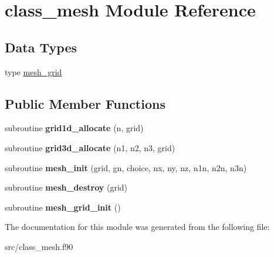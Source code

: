 \hypertarget{classclass__mesh}{\section{class\-\_\-mesh Module Reference}
\label{classclass__mesh}
}
\subsection*{Data Types}
\begin{DoxyCompactItemize}
\item 
type \hyperlink{structclass__mesh_1_1mesh__grid}{mesh\-\_\-grid}
\end{DoxyCompactItemize}
\subsection*{Public Member Functions}
\begin{DoxyCompactItemize}
\item 
\hypertarget{classclass__mesh_a4694eff2e66dc3c6f4c95a4783d0b3cd}{subroutine {\bfseries grid1d\-\_\-allocate} (n, grid)}\label{classclass__mesh_a4694eff2e66dc3c6f4c95a4783d0b3cd}

\item 
\hypertarget{classclass__mesh_a00657d0b88563b96fc3d366a6f5701c9}{subroutine {\bfseries grid3d\-\_\-allocate} (n1, n2, n3, grid)}\label{classclass__mesh_a00657d0b88563b96fc3d366a6f5701c9}

\item 
\hypertarget{classclass__mesh_a8a025df9ede8877a7f59dc4cc9f45cc0}{subroutine {\bfseries mesh\-\_\-init} (grid, gn, choice, nx, ny, nz, n1n, n2n, n3n)}\label{classclass__mesh_a8a025df9ede8877a7f59dc4cc9f45cc0}

\item 
\hypertarget{classclass__mesh_af3070ea3d761bef66d8c9dc6a0a13df6}{subroutine {\bfseries mesh\-\_\-destroy} (grid)}\label{classclass__mesh_af3070ea3d761bef66d8c9dc6a0a13df6}

\item 
\hypertarget{classclass__mesh_aeb0629c9867ec7108d9c02b76971f864}{subroutine {\bfseries mesh\-\_\-grid\-\_\-init} ()}\label{classclass__mesh_aeb0629c9867ec7108d9c02b76971f864}

\end{DoxyCompactItemize}


The documentation for this module was generated from the following file\-:\begin{DoxyCompactItemize}
\item 
src/class\-\_\-mesh.\-f90\end{DoxyCompactItemize}
